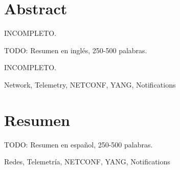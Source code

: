 \chapter*{Abstract}
\Large{INCOMPLETO.}
\begin{abstractEn}
TODO: Resumen en inglés, 250-500 palabras.


\end{abstractEn}
\Large{INCOMPLETO.}
\begin{keywordsEn}
Network, Telemetry, NETCONF, YANG, Notifications
\end{keywordsEn}

\chapter*{Resumen}

\begin{abstractEs}
TODO: Resumen en español, 250-500 palabras.


\end{abstractEs}

\begin{keywordsEs}
Redes, Telemetría, NETCONF, YANG, Notifications
\end{keywordsEs}
